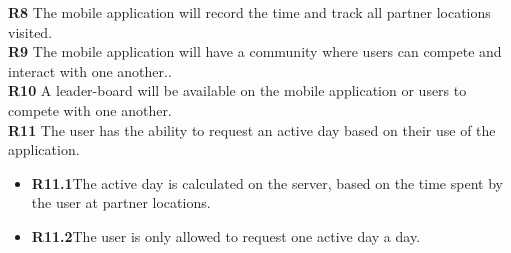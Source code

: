 \documentclass[11pt]{article}
\begin{document}
\textbf{R8} The mobile application will record the time and track all partner locations visited. \\
\textbf{R9} The mobile application will have a community where users can compete and interact with one another..\\
\textbf{R10} A leader-board will be available on the mobile application or users to compete with one another.  \\
\textbf{R11} The user has the ability to request an active day based on their use of the application.
\begin{itemize}	
	\item \textbf{R11.1}The active day is calculated on the server, based on the time spent by the user at partner locations.
	\item \textbf{R11.2}The user is only allowed to request one active day a day. 	
\end{itemize}
\end{document}
